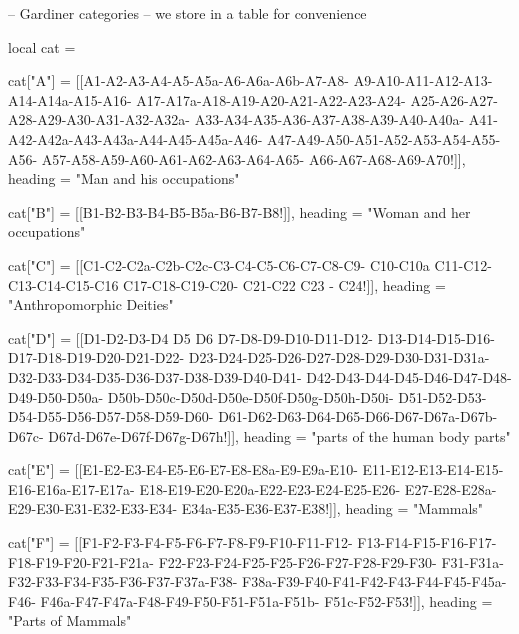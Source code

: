 -- Gardiner categories
-- we store in a table for convenience

local cat = {}

cat["A"]   =   {[[A1-A2-A3-A4-A5-A5a-A6-A6a-A6b-A7-A8-
                 A9-A10-A11-A12-A13-A14-A14a-A15-A16-
                 A17-A17a-A18-A19-A20-A21-A22-A23-A24-
                 A25-A26-A27-A28-A29-A30-A31-A32-A32a-
                 A33-A34-A35-A36-A37-A38-A39-A40-A40a-
                 A41-A42-A42a-A43-A43a-A44-A45-A45a-A46-
                 A47-A49-A50-A51-A52-A53-A54-A55-A56-
                 A57-A58-A59-A60-A61-A62-A63-A64-A65-
                 A66-A67-A68-A69-A70!]],
                 heading = "Man and his occupations"}

cat["B"]   =   {[[B1-B2-B3-B4-B5-B5a-B6-B7-B8!]],
                 heading = "Woman and her occupations"}

cat["C"]   =   {[[C1-C2-C2a-C2b-C2c-C3-C4-C5-C6-C7-C8-C9-
                 C10-C10a
                 C11-C12-C13-C14-C15-C16 C17-C18-C19-C20-
                 C21-C22  C23 - C24!]],
                 heading = "Anthropomorphic Deities"}

cat["D"]   =   {[[D1-D2-D3-D4 D5 D6 D7-D8-D9-D10-D11-D12-
                 D13-D14-D15-D16-D17-D18-D19-D20-D21-D22-
                 D23-D24-D25-D26-D27-D28-D29-D30-D31-D31a-
                 D32-D33-D34-D35-D36-D37-D38-D39-D40-D41-
                 D42-D43-D44-D45-D46-D47-D48-D49-D50-D50a-
                 D50b-D50c-D50d-D50e-D50f-D50g-D50h-D50i-
                 D51-D52-D53-D54-D55-D56-D57-D58-D59-D60-
                 D61-D62-D63-D64-D65-D66-D67-D67a-D67b-D67c-
                 D67d-D67e-D67f-D67g-D67h!]],
                 heading = "parts of the human body parts"}

cat["E"]   =   {[[E1-E2-E3-E4-E5-E6-E7-E8-E8a-E9-E9a-E10-
                 E11-E12-E13-E14-E15-E16-E16a-E17-E17a-
                 E18-E19-E20-E20a-E22-E23-E24-E25-E26-
                 E27-E28-E28a-E29-E30-E31-E32-E33-E34-
                 E34a-E35-E36-E37-E38!]],
                 heading = "Mammals"}

cat["F"]   =   {[[F1-F2-F3-F4-F5-F6-F7-F8-F9-F10-F11-F12-
                  F13-F14-F15-F16-F17-F18-F19-F20-F21-F21a-
                  F22-F23-F24-F25-F25-F26-F27-F28-F29-F30-
                  F31-F31a-F32-F33-F34-F35-F36-F37-F37a-F38-
                  F38a-F39-F40-F41-F42-F43-F44-F45-F45a-F46-
                  F46a-F47-F47a-F48-F49-F50-F51-F51a-F51b-
                  F51c-F52-F53!]],
                  heading = "Parts of Mammals"}

